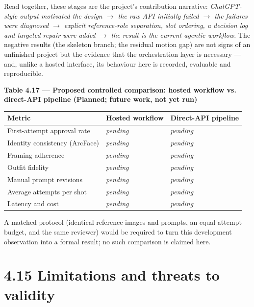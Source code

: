 \documentclass[10pt,twocolumn,letterpaper]{article}
\begin{document}
Read together, these stages are the project's contribution narrative: \emph{ChatGPT-style output motivated the design $\rightarrow$ the raw API initially failed $\rightarrow$ the failures were diagnosed $\rightarrow$ explicit reference-role separation, slot ordering, a decision log and targeted repair were added $\rightarrow$ the result is the current agentic workflow.} The negative results (the skeleton branch; the residual motion gap) are not signs of an unfinished project but the evidence that the orchestration layer is necessary --- and, unlike a hosted interface, its behaviour here is recorded, evaluable and reproducible.

\begin{table}[t]
\centering
{\footnotesize\textbf{\textbf{Table 4.17 --- Proposed controlled comparison: hosted workflow vs. direct-API pipeline (Planned; future work, not yet run)}}}\par\vspace{3pt}
\footnotesize
\begin{tabularx}{\textwidth}{>{\RaggedRight\arraybackslash}Xl>{\RaggedRight\arraybackslash}X}
\toprule
Metric & Hosted workflow & Direct-API pipeline \\
\midrule
First-attempt approval rate & \emph{pending} & \emph{pending} \\
Identity consistency (ArcFace) & \emph{pending} & \emph{pending} \\
Framing adherence & \emph{pending} & \emph{pending} \\
Outfit fidelity & \emph{pending} & \emph{pending} \\
Manual prompt revisions & \emph{pending} & \emph{pending} \\
Average attempts per shot & \emph{pending} & \emph{pending} \\
Latency and cost & \emph{pending} & \emph{pending} \\
\bottomrule
\end{tabularx}
\end{table}

A matched protocol (identical reference images and prompts, an equal attempt budget, and the same reviewer) would be required to turn this development observation into a formal result; no such comparison is claimed here.


\section*{4.15 Limitations and threats to validity}
\end{document}
